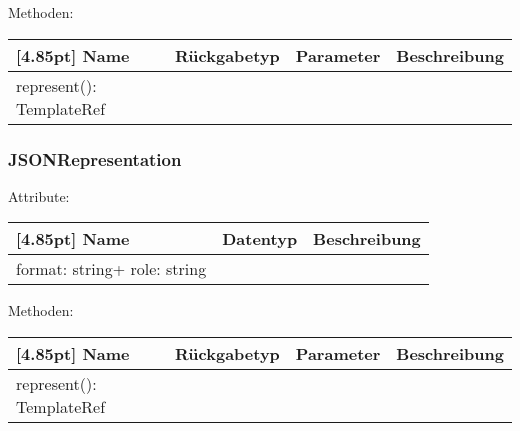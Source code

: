                 Methoden:
        		\begin{center}
                \setlength\tabcolsep{5pt}
                	\renewcommand{\arraystretch}{1.5}
                    	\begin{tabularx}{\textwidth}{|l|l|l|X|}
                    	\hline
                    	\rowcolor[gray]{0.75}[4.85pt]
                		Name & Rückgabetyp & Parameter & Beschreibung \\ \hline
                		represent(): TemplateRef
                        & & &  \\ \hline
                        \end{tabularx}
        		\end{center}
        	
        	\subsubsection{JSONRepresentation}
        	
        	    Attribute:
                \begin{center}
                	\renewcommand{\arraystretch}{1.5}
                    \setlength\tabcolsep{5pt}
                	\begin{tabularx}{\textwidth}{|l|l|X|}
                		\hline
                        \rowcolor[gray]{0.75}[4.85pt]            		
                        Name & Datentyp & Beschreibung \\ \hline
                        format: string+ role: string
                        & &  \\ \hline
                	\end{tabularx}
                \end{center}
                
                Methoden:
        		\begin{center}
                \setlength\tabcolsep{5pt}
                	\renewcommand{\arraystretch}{1.5}
                    	\begin{tabularx}{\textwidth}{|l|l|l|X|}
                    	\hline
                    	\rowcolor[gray]{0.75}[4.85pt]
                		Name & Rückgabetyp & Parameter & Beschreibung \\ \hline
                		represent(): TemplateRef
                        & & &  \\ \hline
                        \end{tabularx}
        		\end{center}
        	
